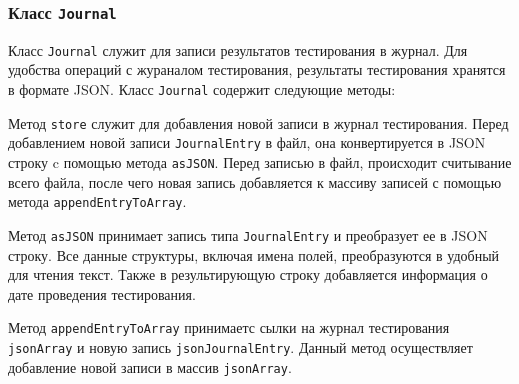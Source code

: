 \subsubsection{Класс \texttt{Journal}}
Класс \texttt{Journal} служит для записи результатов тестирования в журнал. Для удобства операций с жураналом
тестирования, результаты тестирования хранятся в формате JSON. Класс \texttt{Journal} содержит следующие методы:
\begin{enum}
	\item Метод \texttt{store} служит для добавления новой записи в журнал тестирования. Перед добавлением новой
		записи \texttt{JournalEntry} в файл, она конвертируется в JSON строку c помощью метода \texttt{asJSON}.
		Перед записью в файл, происходит считывание всего файла, после чего новая запись добавляется к массиву
		записей с помощью метода \texttt{appendEntryToArray}.

	\item Метод \texttt{asJSON} принимает запись типа \texttt{JournalEntry} и преобразует ее в JSON строку.
		Все данные структуры, включая имена полей, преобразуются в удобный для чтения текст. Также в
		результирующую строку добавляется информация о дате проведения тестирования.

	\item Метод \texttt{appendEntryToArray} принимаетс сылки на журнал тестирования \texttt{jsonArray} и новую
		запись \texttt{jsonJournalEntry}. Данный метод осуществляет добавление новой записи в массив
		\texttt{jsonArray}.
\end{enum}

